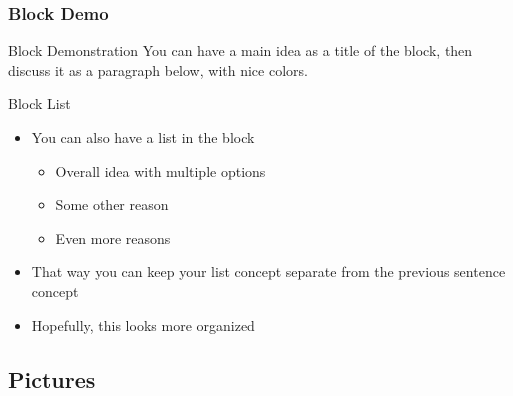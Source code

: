 \begin{frame}\frametitle{Block Demo}

  \begin{block}{Block Demonstration}
You can have a main idea as a title of the block, then discuss it as a paragraph below, with nice colors.
\end{block}


\begin{block}{Block List}
    \begin{itemize}
      \item You can also have a list in the block
        \begin{itemize}
          \item Overall idea with multiple options
          \item Some other reason
          \item Even more reasons
        \end{itemize}
      \item That way you can keep your list concept separate from the previous sentence concept
      \item Hopefully, this looks more organized
    \end{itemize}
\end{block}
\end{frame}



\subsection{Pictures}



